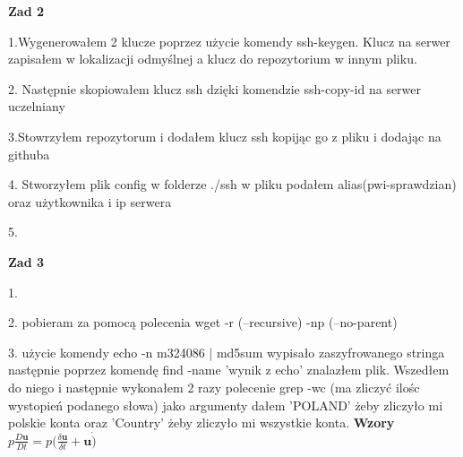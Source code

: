 \documentclass[10pt,a4paper]{article}
\begin{document}
	
	\textbf{Zad 2}
	
	1.Wygenerowałem 2 klucze poprzez użycie komendy ssh-keygen. Klucz na serwer zapisałem w lokalizacji odmyślnej a klucz do repozytorium w innym pliku.
	
	2. Następnie skopiowałem klucz ssh dzięki komendzie ssh-copy-id na serwer uczelniany
	
	3.Stowrzyłem repozytorum i dodałem klucz ssh kopijąc go z pliku i dodając na githuba
	
	4. Stworzyłem plik config w folderze ./ssh w pliku podałem alias(pwi-sprawdzian) oraz użytkownika i ip serwera
	
	5.
	
	\textbf{Zad 3}
	
	1.
	
	2. pobieram za pomocą polecenia wget -r (--recursive) -np (--no-parent) 
	
	3. użycie komendy echo -n m324086 | md5sum wypisało zaszyfrowanego stringa następnie poprzez komendę find -name 'wynik z echo' znalazłem plik. Wszedłem do niego i następnie wykonałem 2 razy polecenie grep -wc (ma zliczyć ilośc wystopień podanego słowa) jako argumenty dałem 'POLAND' żeby zliczyło mi polskie konta oraz 'Country' żeby zliczyło mi wszystkie konta.
	\textbf{Wzory}
	 $ p\frac{D\textbf{u}}{Dt} = p(\frac{\delta\textbf{u}}{\delta t}+\textbf{u}\dot)$
		
\end{document}
